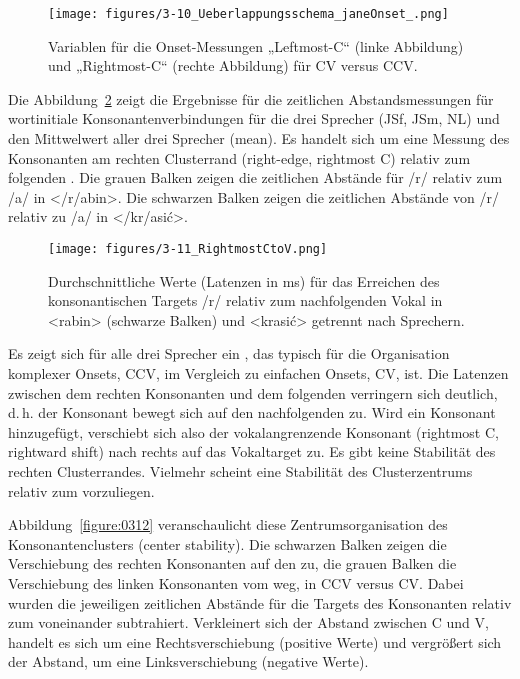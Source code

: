 {\begin{figure}
	\texttt{[image: figures/3-10\_Ueberlappungsschema\_janeOnset\_.png]}
	\caption{Variablen für die Onset-Messungen „Leftmost-C“ (linke Abbildung) und „Rightmost-C“ (rechte Abbildung) für CV versus CCV.}
	\label{figure:0310}
\end{figure}

Die Abbildung~\ref{figure:0311} zeigt die Ergebnisse für die zeitlichen Abstandsmessungen für wortinitiale Konsonantenverbindungen für die drei Sprecher (JSf, JSm, NL) und den Mittwelwert aller drei Sprecher (mean). Es handelt sich um eine Messung des Konsonanten am rechten Clusterrand (right-edge, rightmost C) relativ zum folgenden . Die grauen Balken zeigen die zeitlichen Abstände für  /r/ relativ zum  /a/ in </r/abin>. Die schwarzen Balken zeigen die zeitlichen Abstände von /r/ relativ zu /a/ in </kr/asić>.

\begin{figure}
	\texttt{[image: figures/3-11\_RightmostCtoV.png]}
	\caption{Durchschnittliche Werte (Latenzen in ms) für das Erreichen des konsonantischen Targets /r/ relativ zum nachfolgenden Vokal in <rabin> (schwarze Balken) und <krasić> getrennt nach Sprechern.}
	\label{figure:0311}
\end{figure}

\newpage 
Es zeigt sich für alle drei Sprecher ein , das typisch für die Organisation komplexer Onsets, CCV, im Vergleich zu einfachen Onsets, CV, ist. Die Latenzen zwischen dem rechten Konsonanten und dem folgenden  verringern sich deutlich, d.\,h. der Konsonant bewegt sich auf den nachfolgenden  zu. Wird ein Konsonant hinzugefügt, verschiebt sich also der vokalangrenzende Konsonant (rightmost C, rightward shift) nach rechts auf das Vokaltarget zu. Es gibt keine Stabilität des rechten Clusterrandes. Vielmehr scheint eine Stabilität des Clusterzentrums relativ zum  vorzuliegen. 

Abbildung~\ref{figure:0312} veranschaulicht diese Zentrumsorganisation des Konsonantenclusters (center stability). Die schwarzen Balken zeigen die Verschiebung des rechten Konsonanten auf den  zu, die grauen Balken die Verschiebung des linken Konsonanten vom  weg, in CCV versus CV. Dabei wurden die jeweiligen zeitlichen Abstände für die Targets des Konsonanten relativ zum  voneinander subtrahiert. Verkleinert sich der Abstand zwischen C und V, handelt es sich um eine Rechtsverschiebung (positive Werte) und vergrößert sich der Abstand, um eine Linksverschiebung (negative Werte).

}
